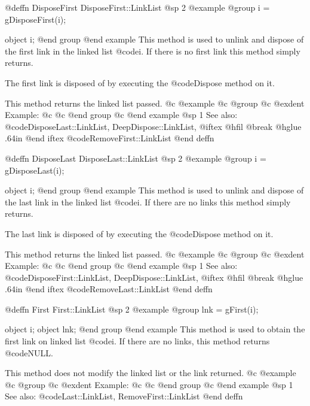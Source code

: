 @deffn {DisposeFirst} DisposeFirst::LinkList
@sp 2
@example
@group
i = gDisposeFirst(i);

object  i;
@end group
@end example
This method is used to unlink and dispose of the first link in the
linked list @code{i}.  If there is no first link this method simply
returns.

The first link is disposed of by executing the @code{Dispose}
method on it.

This method returns the linked list passed.
@c @example
@c @group
@c @exdent Example:
@c 
@c @end group
@c @end example
@sp 1
See also:  @code{DisposeLast::LinkList, DeepDispose::LinkList,}
@iftex
@hfil @break @hglue .64in      
@end iftex
@code{RemoveFirst::LinkList}
@end deffn










@deffn {DisposeLast} DisposeLast::LinkList
@sp 2
@example
@group
i = gDisposeLast(i);

object  i;
@end group
@end example
This method is used to unlink and dispose of the last link in the
linked list @code{i}.  If there are no links this method simply
returns.

The last link is disposed of by executing the @code{Dispose}
method on it.

This method returns the linked list passed.
@c @example
@c @group
@c @exdent Example:
@c 
@c @end group
@c @end example
@sp 1
See also:  @code{DisposeFirst::LinkList, DeepDispose::LinkList,}
@iftex
@hfil @break @hglue .64in      
@end iftex
@code{RemoveLast::LinkList}
@end deffn










@deffn {First} First::LinkList
@sp 2
@example
@group
lnk = gFirst(i);

object  i;
object  lnk;
@end group
@end example
This method is used to obtain the first link on linked list @code{i}.
If there are no links, this method returns @code{NULL}.

This method does not modify the linked list or the link returned.
@c @example
@c @group
@c @exdent Example:
@c 
@c @end group
@c @end example
@sp 1
See also:  @code{Last::LinkList, RemoveFirst::LinkList}
@end deffn











